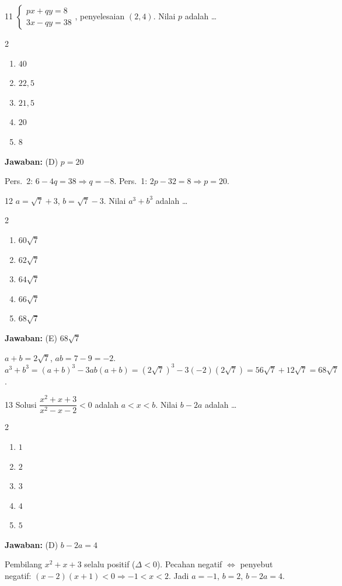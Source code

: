 \documentclass[11pt]{article}
\newcommand{\jawaban}[1]{%
  \noindent\colorbox{gold!30}{\parbox{\dimexpr\linewidth-2\fboxsep\relax}{%
    \textbf{Jawaban:} #1}}\par\smallskip}
\newenvironment{pilB}{%
  \par\smallskip\begin{multicols}{2}
  \begin{enumerate}[label=(\Alph*),leftmargin=*,itemsep=1pt,topsep=3pt]}%
  {\end{enumerate}\end{multicols}}
\begin{document}

\begin{soal}{11}
$\begin{cases}px+qy=8\\ 3x-qy=38\end{cases}$, penyelesaian $(2,4)$. Nilai $p$ adalah \ldots
\begin{pilB}\item $40$\item $22{,}5$\item $21{,}5$\item $20$\item $8$\end{pilB}
\end{soal}
\begin{pembox}
\jawaban{(D) $p=20$}
Pers.\ 2: $6-4q=38\Rightarrow q=-8$. Pers.\ 1: $2p-32=8\Rightarrow p=20$.
\end{pembox}

\begin{soal}{12}
$a=\sqrt7+3$, $b=\sqrt7-3$. Nilai $a^3+b^3$ adalah \ldots
\begin{pilB}\item $60\sqrt7$\item $62\sqrt7$\item $64\sqrt7$\item $66\sqrt7$\item $68\sqrt7$\end{pilB}
\end{soal}
\begin{pembox}
\jawaban{(E) $68\sqrt7$}
$a+b=2\sqrt7$, $ab=7-9=-2$.
$a^3+b^3=(a+b)^3-3ab(a+b)=(2\sqrt7)^3-3(-2)(2\sqrt7)=56\sqrt7+12\sqrt7=68\sqrt7$.
\end{pembox}

\begin{soal}{13}
Solusi $\dfrac{x^2+x+3}{x^2-x-2}<0$ adalah $a<x<b$. Nilai $b-2a$ adalah \ldots
\begin{pilB}\item $1$\item $2$\item $3$\item $4$\item $5$\end{pilB}
\end{soal}
\begin{pembox}
\jawaban{(D) $b-2a=4$}
Pembilang $x^2+x+3$ selalu positif ($\Delta<0$). Pecahan negatif $\Leftrightarrow$ penyebut negatif:
$(x-2)(x+1)<0\Rightarrow-1<x<2$. Jadi $a=-1$, $b=2$, $b-2a=4$.
\end{pembox}
\end{document}
